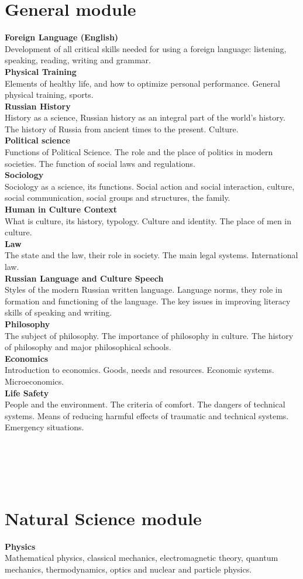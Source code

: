 \documentclass[a4paper, 12pt]{article}
\newcommand{\group}[1] {\section{#1}}
\newcommand{\discipline}[1] {\textbf{#1} \\ }
\newcommand{\desc}[1] { #1 \\ }
\begin{document}
\group{General module}

\discipline{Foreign Language (English)}
\desc{Development of all critical skills needed for using a foreign language: listening, speaking, reading, writing and grammar.}

\discipline{Physical Training}
\desc{Elements of healthy life, and how to optimize personal performance. General physical training, sports.}

\discipline{Russian History}
\desc{History as a science, Russian history as an integral part of the world's history. The history of Russia from ancient times to the present. Culture.}

\discipline{Political science}
\desc{Functions of Political Science. The role and the place of politics in modern societies. The function of social laws and regulations.}

\discipline{Sociology}
\desc{Sociology as a science, its functions. Social action and social interaction, culture, social communication, social groups and structures, the family.}

\discipline{Human in Culture Context}
\desc{What is culture, its history, typology. Culture and identity. The place of men in culture.}

\discipline{Law}
\desc{The state and the law, their role in society. The main legal systems. International law.}

\discipline{Russian Language and Culture Speech}
\desc{Styles of the modern Russian written language. Language norms, they role in formation and functioning of the language. The key issues in improving literacy skills of speaking and writing.}

\discipline{Philosophy}
\desc{The subject of philosophy. The importance of philosophy in culture. The history of philosophy and major philosophical schools.}

\discipline{Economics}
\desc{Introduction to economics. Goods, needs and resources. Economic systems. Microeconomics.}

\discipline{Life Safety}
\desc{People and the environment. The criteria of comfort. The dangers of technical systems. Means of reducing harmful effects of traumatic and technical systems. Emergency situations.}

\

\

\

\group{Natural Science module}

\discipline{Physics}
\desc{Mathematical physics, classical mechanics, electromagnetic theory, quantum mechanics, thermodynamics, optics and nuclear and particle physics.}
\end{document}
